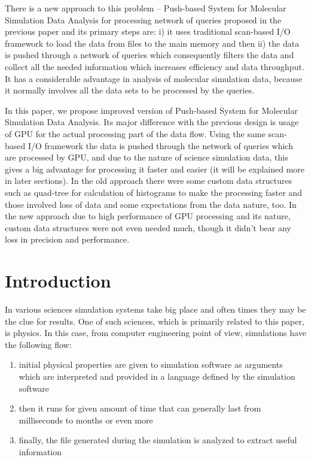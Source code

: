 \documentclass[12pt,letterpaper]{report}
\makeatletter
\newcommand\mainmatter{%
    \cleardoublepage
  \pagenumbering{arabic}}
\makeatother
\begin{document}
There is a new approach to this problem -- Push-based System for Molecular Simulation Data Analysis for processing network of queries proposed in the previous paper and its primary steps are: i) it uses traditional scan-based I/O framework to load the data from files to the main memory and then ii) the data is pushed through a network of queries which consequently filters the data and collect all the needed information which increases efficiency and data throughput. It has a considerable advantage in analysis of molecular simulation data, because it normally involves all the data sets to be processed by the queries.

In this paper, we propose improved version of Push-based System for Molecular Simulation Data Analysis. Its major difference with the previous design is usage of GPU for the actual processing part of the data flow. Using the same scan-based I/O framework the data is pushed through the network of queries which are processed by GPU, and due to the nature of science simulation data, this gives a big advantage for processing it faster and easier (it will be explained more in later sections). In the old approach there were some custom data structures such as quad-tree for calculation of histograms to make the processing faster and those involved loss of data and some expectations from the data nature, too. In the new approach due to high performance of GPU processing and its nature, custom data structures were not even needed much, though it didn't bear any loss in precision and performance.



\mainmatter
\linespread{1}\selectfont

\chapter{Introduction} \linespread{2}\selectfont \justify

\hspace{3em} In various sciences simulation systems take big place and often times they may be the clue for results. One of such sciences, which is primarily related to this paper, is physics. In this case, from computer engineering point of view, simulations have the following flow:

\begin{enumerate}
	\item initial physical properties are given to simulation software as arguments which are interpreted and provided in a language defined by the simulation software
	\item then it runs for given amount of time that can generally last from milliseconds to months or even more
	\item finally, the file generated during the simulation is analyzed to extract useful information
\end{enumerate}
\end{document}
